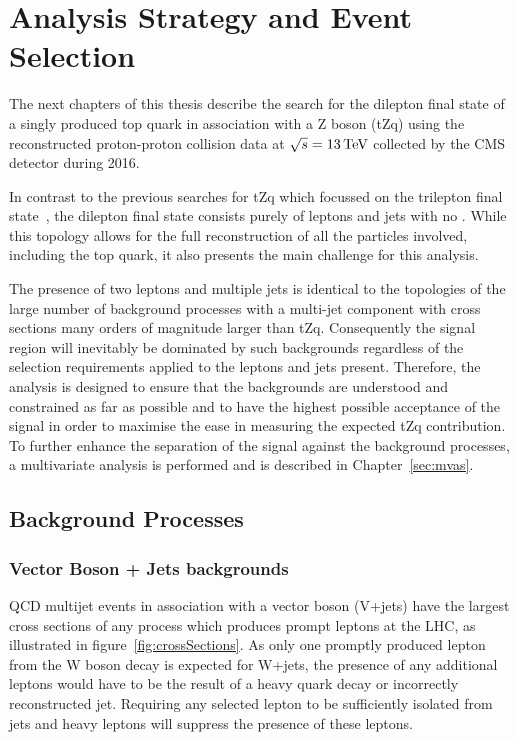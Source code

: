 \chapter{Analysis Strategy and Event Selection}\label{chapter:tzq-search}
The next chapters of this thesis describe the search for the dilepton final state of a singly produced top quark in association with a Z boson (tZq) using the reconstructed proton-proton collision data at $\sqrt{s} = 13\,\text{Te\hspace{-.08em}V}$ collected by the CMS detector during 2016.

In contrast to the previous searches for tZq which focussed on the trilepton final state~\cite{Sirunyan:2017kkr,Sirunyan:2017nbr}, the dilepton final state consists purely of leptons and jets with no \MET.
While this topology allows for the full reconstruction of all the particles involved, including the top quark, it also presents the main challenge for this analysis.

The presence of two leptons and multiple jets is identical to the topologies of the large number of background processes with a multi-jet component with cross sections many orders of magnitude larger than tZq.
Consequently the signal region will inevitably be dominated by such backgrounds regardless of the selection requirements applied to the leptons and jets present.
Therefore, the analysis is designed to ensure that the backgrounds are understood and constrained as far as possible and to have the highest possible acceptance of the signal in order to maximise the ease in measuring the expected tZq contribution.
To further enhance the separation of the signal against the background processes, a multivariate analysis is performed and is described in Chapter~\ref{sec:mvas}.

\section{Background Processes}\label{sec:backgroundProcesses}
\subsection{Vector Boson + Jets backgrounds}
QCD multijet events in association with a vector boson (V+jets) have the largest cross sections of any process which produces prompt leptons at the LHC, as illustrated in figure~\ref{fig:crossSections}.
As only one promptly produced lepton from the W boson decay is expected for W+jets, the presence of any additional leptons would have to be the result of a heavy quark decay or incorrectly reconstructed jet. 
Requiring any selected lepton to be sufficiently isolated from jets and heavy leptons will suppress the presence of these leptons.

